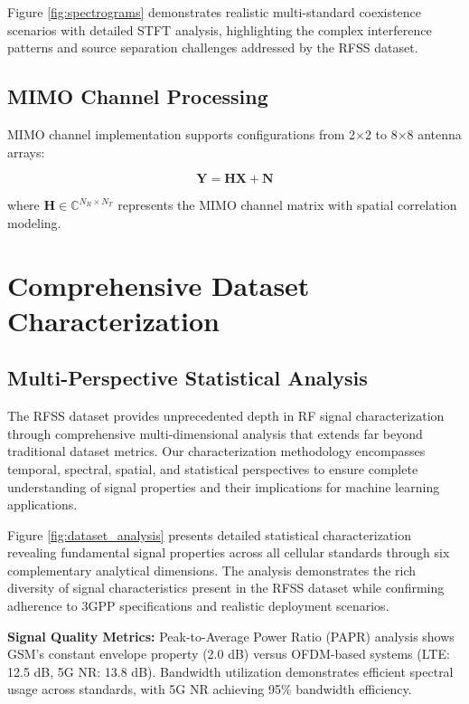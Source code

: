 \documentclass[twocolumn]{article}
\begin{document}
Figure \ref{fig:spectrograms} demonstrates realistic multi-standard coexistence scenarios with detailed STFT analysis, highlighting the complex interference patterns and source separation challenges addressed by the RFSS dataset.

\subsection{MIMO Channel Processing}

MIMO channel implementation supports configurations from 2×2 to 8×8 antenna arrays:

\begin{equation}
\mathbf{Y} = \mathbf{H} \mathbf{X} + \mathbf{N}
\end{equation}

where $\mathbf{H} \in \mathbb{C}^{N_R \times N_T}$ represents the MIMO channel matrix with spatial correlation modeling.

\section{Comprehensive Dataset Characterization}

\subsection{Multi-Perspective Statistical Analysis}

The RFSS dataset provides unprecedented depth in RF signal characterization through comprehensive multi-dimensional analysis that extends far beyond traditional dataset metrics. Our characterization methodology encompasses temporal, spectral, spatial, and statistical perspectives to ensure complete understanding of signal properties and their implications for machine learning applications.

Figure \ref{fig:dataset_analysis} presents detailed statistical characterization revealing fundamental signal properties across all cellular standards through six complementary analytical dimensions. The analysis demonstrates the rich diversity of signal characteristics present in the RFSS dataset while confirming adherence to 3GPP specifications and realistic deployment scenarios.

\textbf{Signal Quality Metrics:} Peak-to-Average Power Ratio (PAPR) analysis shows GSM's constant envelope property (2.0 dB) versus OFDM-based systems (LTE: 12.5 dB, 5G NR: 13.8 dB). Bandwidth utilization demonstrates efficient spectral usage across standards, with 5G NR achieving 95\% bandwidth efficiency.
\end{document}
